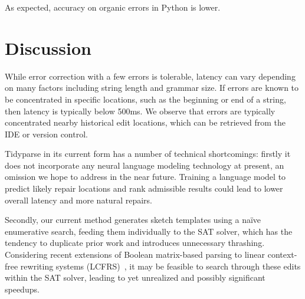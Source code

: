 \documentclass[sigplan,nonacm]{acmart}\settopmatter{printfolios=false,printccs=false,printacmref=false}
\begin{document}
\begin{figure}[H]
\hspace{-0.25cm}
\end{figure}

As expected, accuracy on organic errors in Python is lower.

\pagebreak\section{Discussion}\label{sec:discussion}

While error correction with a few errors is tolerable, latency can vary depending on many factors including string length and grammar size. If errors are known to be concentrated in specific locations, such as the beginning or end of a string, then latency is typically below 500ms. We observe that errors are typically concentrated nearby historical edit locations, which can be retrieved from the IDE or version control.

Tidyparse in its current form has a number of technical shortcomings: firstly it does not incorporate any neural language modeling technology at present, an omission we hope to address in the near future. Training a language model to predict likely repair locations and rank admissible results could lead to lower overall latency and more natural repairs.

Secondly, our current method generates sketch templates using a na\"ive enumerative search, feeding them individually to the SAT solver, which has the tendency to duplicate prior work and introduces unnecessary thrashing. Considering recent extensions of Boolean matrix-based parsing to linear context-free rewriting systems (LCFRS)~\cite{cohen2016parsing}, it may be feasible to search through these edits within the SAT solver, leading to yet unrealized and possibly significant speedups.
\end{document}
